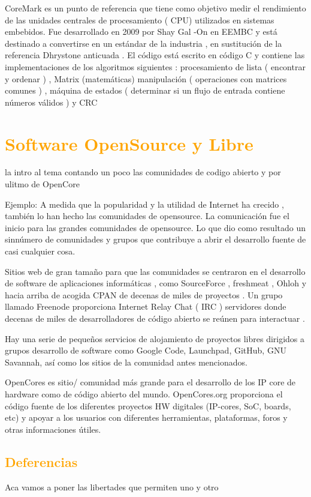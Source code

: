 \documentclass[a4paper,11pt]{article}
\begin{document}
CoreMark es un punto de referencia que tiene como objetivo medir el rendimiento de las unidades centrales de procesamiento ( CPU) utilizados en sistemas embebidos. Fue desarrollado en 2009 por Shay Gal -On en EEMBC y está destinado a convertirse en un estándar de la industria , en sustitución de la referencia Dhrystone anticuada . El código está escrito en código C y contiene las implementaciones de los algoritmos siguientes : procesamiento de lista ( encontrar y ordenar ) , Matrix (matemáticas) manipulación ( operaciones con matrices comunes ) , máquina de estados ( determinar si un flujo de entrada contiene números válidos ) y CRC

\section{\textcolor{orange}{Software OpenSource y Libre}}%
la intro al tema contando un poco  las comunidades de codigo abierto y por ulitmo de OpenCore

Ejemplo: 
A medida que la popularidad y la utilidad de Internet ha crecido , también lo han hecho las comunidades de opensource.
La comunicación fue el inicio para las grandes comunidades de opensource. Lo que  dio como resultado un sinnúmero de comunidades y grupos que contribuye a abrir el desarrollo fuente de casi cualquier cosa.

Sitios web de gran tamaño para que las comunidades se centraron en el desarrollo de software de aplicaciones informáticas , como SourceForce , freshmeat , Ohloh y hacia arriba de acogida CPAN de decenas de miles de proyectos . Un grupo llamado Freenode proporciona Internet Relay Chat ( IRC ) servidores donde decenas de miles de desarrolladores de código abierto se reúnen para interactuar .

Hay una serie de pequeños servicios de alojamiento de proyectos libres dirigidos a grupos desarrollo de software como Google Code, Launchpad, GitHub, GNU Savannah,
así como los sitios de la comunidad antes mencionados.

OpenCores es  sitio/ comunidad más grande para el desarrollo de los  IP core de hardware como de código abierto del mundo.
OpenCores.org proporciona el código fuente de los diferentes proyectos HW digitales (IP-cores, SoC, boards, etc) y apoyar a los usuarios con diferentes herramientas, plataformas, foros y otras informaciones útiles. 

		\subsection{\textcolor{orange}{Deferencias}}%
Aca vamos a poner las libertades que permiten uno y otro
\end{document}
